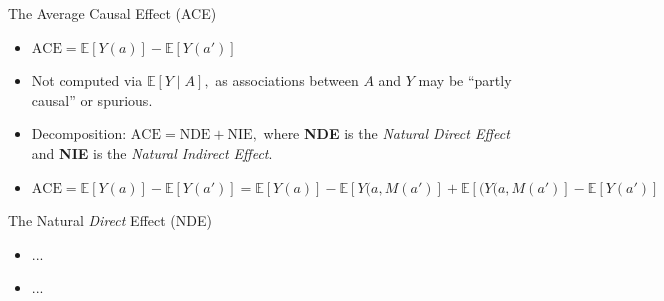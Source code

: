 \documentclass[12pt,t,handout]{beamer}
\newcommand{\E}{\mathbb{E}}
\begin{document}

\begin{frame}[c]{The Average Causal Effect (ACE)}

\begin{center}
\begin{itemize}
  \itemsep10pt
  \item $\text{ACE} = \E[Y(a)] - \E[Y(a')]$
  \item Not computed via $\E[Y \mid A],$ as associations between $A$ and $Y$ may
    be ``partly causal'' or spurious.
  \item Decomposition: $\text{ACE} = \text{NDE} + \text{NIE},$ where
    \textbf{NDE} is the \textit{Natural Direct Effect} and \textbf{NIE} is the
    \textit{Natural Indirect Effect}.
  \item $\text{ACE} = \E[Y(a)] - \E[Y(a')] = \E[Y(a)] - \E[Y(a, M(a')] +
    \E[(Y(a, M(a')] - \E[Y(a')]$
\end{itemize}
\end{center}


\end{frame}


\begin{frame}[c]{The Natural \textit{Direct} Effect (NDE)}

\begin{center}
\begin{itemize}
  \item ...
  \item ...
\end{itemize}
\end{center}


\end{frame}

\end{document}
